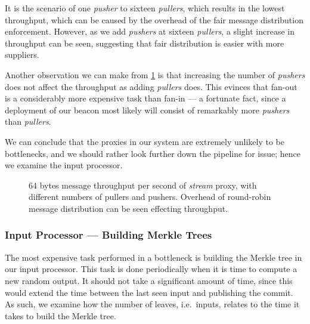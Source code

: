 It is the scenario of one \textit{pusher} to sixteen \textit{pullers}, which results in the lowest throughput, which can be caused by the overhead of the fair message distribution enforcement.
However, as we add \textit{pushers} at sixteen \textit{pullers}, a slight increase in throughput can be seen, suggesting that fair distribution is easier with more suppliers.

Another observation we can make from \cref{fig:proxy_throughput} is that increasing the number of \textit{pushers} does not affect the throughput as adding \textit{pullers} does.
This evinces that fan-out is a considerably more expensive task than fan-in --- a fortunate fact, since a deployment of our beacon most likely will consist of remarkably more \textit{pushers} than \textit{pullers}.

We can conclude that the proxies in our system are extremely unlikely to be bottlenecks, and we should rather look further down the pipeline for issue; hence we examine the input processor.

\begin{figure}
    \centering
    \footnotesize
    \caption{%
        64 bytes message throughput per second of \textit{stream} proxy, with different numbers of pullers and pushers.
Overhead of round-robin message distribution can be seen effecting throughput.}%
\label{fig:proxy_throughput}
\end{figure}

\subsubsection{Input Processor --- Building Merkle Trees}%
\label{ssub:input_processor_building_merkle_trees}
The most expensive task performed in a bottleneck is building the Merkle tree in our input processor.
This task is done periodically when it is time to compute a new random output.
It should not take a significant amount of time, since this would extend the time between the last seen input and publishing the commit.
As such, we examine how the number of leaves, i.e.\ inputs, relates to the time it takes to build the Merkle tree.

